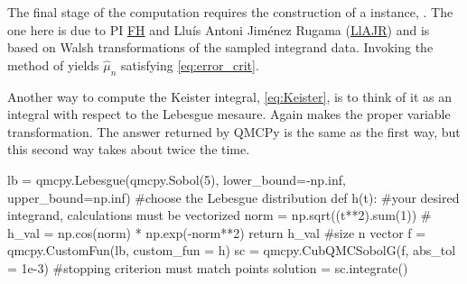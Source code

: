 \documentclass[11pt]{NSFamsart}
\newcommand{\FH}{\hyperlink{FHlink}{FH}\xspace}
\newcommand{\LlAJR}{\hyperlink{LlAJRlink}{LlAJR}\xspace}
\newcommand{\hmu}{\hat{\mu}}
\begin{document}
The final stage of the computation requires the construction of a  instance, .  The one here is due to PI \FH and \hypertarget{LlAJRlink}{Llu\'is Antoni Jim\'enez Rugama} (\LlAJR) \cite{HicJim16a} and is based on Walsh transformations of the sampled integrand data.  Invoking the  method of  yields $\hmu_n$ satisfying \eqref{eq:error_crit}.

Another way to compute the Keister integral, \eqref{eq:Keister}, is to think of it as an integral with respect to the Lebesgue mesaure.  Again  makes the proper variable transformation.  The answer returned by QMCPy is the same as the first way, but this second way takes about twice the time.

 \begin{pythoncode}
lb = qmcpy.Lebesgue(qmcpy.Sobol(5), lower_bound=-np.inf, upper_bound=np.inf)   #choose the Lebesgue distribution
def h(t):  #your desired integrand, calculations must be vectorized
 	norm = np.sqrt((t**2).sum(1))  #
 	h_val = np.cos(norm) * np.exp(-norm**2)
 	return h_val  #size n vector
 f = qmcpy.CustomFun(lb, custom_fun = h)
 sc = qmcpy.CubQMCSobolG(f, abs_tol = 1e-3)  #stopping criterion must match  points
 solution = sc.integrate()
 \end{pythoncode}

\end{document}
